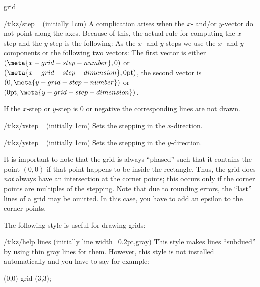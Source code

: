 \begin{pathoperation}{grid}{}
\begin{key}{/tikz/step= (initially 1cm)}
        A complication arises when the $x$- and/or $y$-vector do not point
        along the axes. Because of this, the actual rule for computing the
        $x$-step and the $y$-step is the following: As the $x$- and $y$-steps
        we use the $x$- and $y$-components or the following two vectors: The
        first vector is either $(\meta{x-grid-step-number},0)$ or
        $(\meta{x-grid-step-dimension},0\mathrm{pt})$, the second vector is
        $(0,\meta{y-grid-step-number})$ or
        $(0\mathrm{pt},\meta{y-grid-step-dimension})$.

        If the $x$-step or $y$-step is $0$ or negative the corresponding lines
        are not drawn.
    \end{key}

    \begin{key}{/tikz/xstep= (initially 1cm)}
        Sets the stepping in the $x$-direction.
\begin{codeexample}[]
\end{codeexample}
    \end{key}

    \begin{key}{/tikz/ystep= (initially 1cm)}
        Sets the stepping in the $y$-direction.
    \end{key}

    It is important to note that the grid is always ``phased'' such that it
    contains the point $(0,0)$ if that point happens to be inside the
    rectangle. Thus, the grid does \emph{not} always have an intersection at
    the corner points; this occurs only if the corner points are multiples of
    the stepping. Note that due to rounding errors, the ``last'' lines of a
    grid may be omitted. In this case, you have to add an epsilon to the corner
    points.

    The following style is useful for drawing grids:
    \begin{stylekey}{/tikz/help lines (initially {line width=0.2pt,gray})}
        This style makes lines ``subdued'' by using thin gray lines for them.
        However, this style is not installed automatically and you have to say
        for example:
\begin{codeexample}[]
\tikz {} (0,0) grid (3,3);
\end{codeexample}
    \end{stylekey}
\end{pathoperation}


